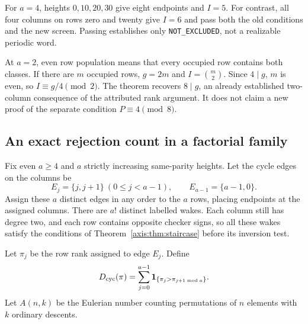 For $a=4$, heights $0,10,20,30$ give eight endpoints and $I=5$.
For contrast, all four columns on rows zero and twenty give $I=6$ and pass
both the old conditions and the new screen. Passing establishes only
\texttt{NOT\_EXCLUDED}, not a realizable periodic word.

At $a=2$, even row population means that every occupied row contains both
classes. If there are $m$ occupied rows, $g=2m$ and $I=\binom m2$.
Since $4\mid g$, $m$ is even, so $I\equiv g/4\pmod2$. The theorem recovers
$8\mid g$, an already established two-column consequence of the attributed
rank argument. It does not claim a new proof of the separate condition
$P\equiv4\pmod8$.

\subsection{An exact rejection count in a factorial family}\label{axis:sec:count}
Fix even $a\ge4$ and $a$ strictly increasing same-parity heights. Let the
cycle edges on the columns be
\[
 E_j=\{j,j+1\}\ (0\le j<a-1),\qquad E_{a-1}=\{a-1,0\}.
\]
Assign these $a$ distinct edges in any order to the $a$ rows, placing endpoints
at the assigned columns. There are $a!$ distinct labelled wakes. Each column
still has degree two, and each row contains opposite checker signs, so all
these wakes satisfy the conditions of Theorem~\ref{axis:thm:staircase} before its
inversion test.

Let $\pi_j$ be the row rank assigned to edge $E_j$. Define
\[
 D_{\rm cyc}(\pi)=\sum_{j=0}^{a-1}\mathbf1_{\{\pi_j>\pi_{j+1\bmod a}\}}.
\]
Let $A(n,k)$ be the Eulerian number counting permutations of $n$ elements with
$k$ ordinary descents.

